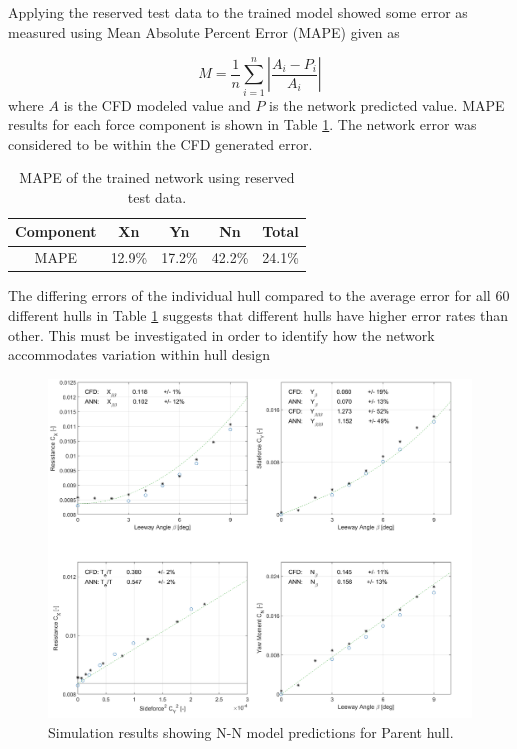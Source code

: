 \documentclass[twoside,twocolumn]{article}
\begin{document}
Applying the reserved test data to the trained model showed some error as measured using Mean Absolute Percent Error (MAPE) given as 

\begin{equation}
M = \frac{1}{n}\sum_{i=1}^{n}\left | \frac{A_{i}-P_{i}}{A_{i}} \right |
\end{equation}
\noindent
where $A$ is the CFD modeled value and $P$ is the network predicted value. MAPE results for each force component is shown in Table \ref{tab:test_results}. The network error was considered to be within the CFD generated error.

\begin{table}[]
	\centering
	\caption{MAPE of the trained network using reserved test data.}
	\label{tab:test_results}
	\begin{tabular}{@{}ccccc@{}}
		\toprule
		\textbf{Component} & \textbf{Xn} & \textbf{Yn} & \textbf{Nn} & \textbf{Total} \\ \midrule
		MAPE & 12.9\% & 17.2\% & 42.2\% & 24.1\% \\ \bottomrule
	\end{tabular}
\end{table}

The differing errors of the individual hull compared to the average error for all 60 different hulls in Table \ref{tab:test_results} suggests that different hulls have higher error rates than other. This must be investigated in order to identify how the network accommodates variation within hull design


\begin{figure}[!ht]
	\centering
	\includegraphics[width=\textwidth]{images/verplot_Y.png}  %
	\caption{Simulation results showing N-N model predictions for \DWA Parent hull.}
	\label{fig:verplotY}
\end{figure}
\end{document}
